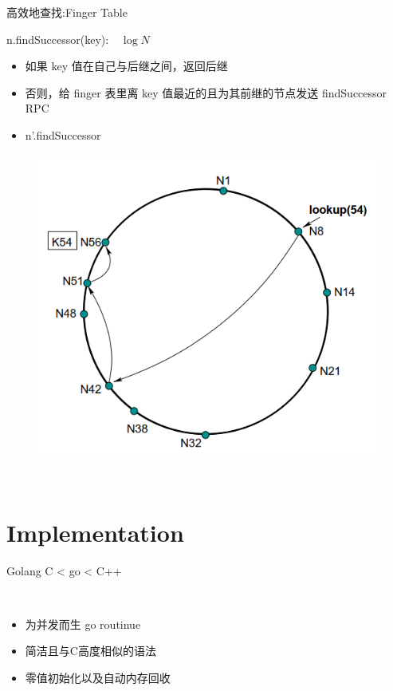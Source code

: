\documentclass[10pt]{beamer}
\begin{document}
\begin{frame}{高效地查找:Finger Table}

\alert{n.findSuccessor(key):} \ $\ \log N$ \\
\begin{itemize}
\item
如果 key 值在自己与后继之间，返回后继 \\
\item
否则，给 finger 表里离 key 值最近的且为其前继的节点发送 findSuccessor RPC \\
\item
n'.findSuccessor
\end{itemize}


\begin{figure}
\centering
\includegraphics[scale=0.5]{figure/lookup.png}
\end{figure}

\\[20pt]

\end{frame}

\section{Implementation}
\begin{frame}{Golang}
C < go < C++

\\[20pt]

\begin{itemize}
\item 为并发而生 go routinue
\item 简洁且与C高度相似的语法
\item 零值初始化以及自动内存回收

\end{itemize}
\end{frame}
\end{document}
